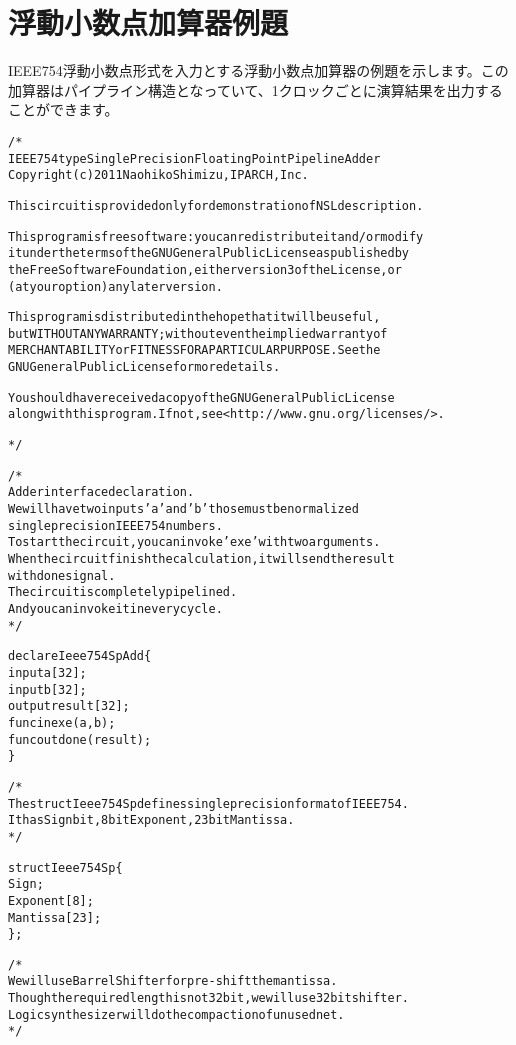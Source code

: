 \chapter{浮動小数点加算器例題}
\label{chap:fpexample}

IEEE754浮動小数点形式を入力とする浮動小数点加算器の例題を示します。この加算器はパイプライン構造となっていて、1クロックごとに演算結果を出力することができます。

\begin{reviewlist}
\begin{alltt}
/*
  IEEE 754 type Single Precision Floating Point Pipeline Adder
  Copyright (c) 2011 Naohiko Shimizu, IP ARCH, Inc.

  This circuit is provided only for demonstration of NSL description.

    This program is free software: you can redistribute it and/or modify
    it under the terms of the GNU General Public License as published by
    the Free Software Foundation, either version 3 of the License, or
    (at your option) any later version.

    This program is distributed in the hope that it will be useful,
    but WITHOUT ANY WARRANTY; without even the implied warranty of
    MERCHANTABILITY or FITNESS FOR A PARTICULAR PURPOSE.  See the
    GNU General Public License for more details.

    You should have received a copy of the GNU General Public License
    along with this program.  If not, see \textless{}http://www.gnu.org/licenses/\textgreater{}.


*/

/*
  Adder interface declaration.
  We will have two inputs 'a' and 'b' those must be normalized
  single precision IEEE754 numbers.
  To start the circuit, you can invoke 'exe' with two arguments.
  When the circuit finish the calculation, it will send the result
  with done signal.
  The circuit is completely pipelined.
  And you can invoke it in every cycle.
*/

declare Ieee754SpAdd \{
	input a[32];
	input b[32];
	output result[32];
	func\textunderscore{}in exe(a,b);
	func\textunderscore{}out done(result);
\}

/*
   The struct Ieee754Sp defines single precision format of IEEE754.
   It has Sign bit, 8bit Exponent, 23bit Mantissa.
*/

struct Ieee754Sp \{
	Sign;
	Exponent[8];
	Mantissa[23];
\};

/*
  We will use Barrel Shifter for pre-shift the mantissa.
  Though the required length is not 32bit, we will use 32bit shifter.
  Logic synthesizer will do the compaction of unused net.
*/


\end{alltt}
\end{reviewlist}
